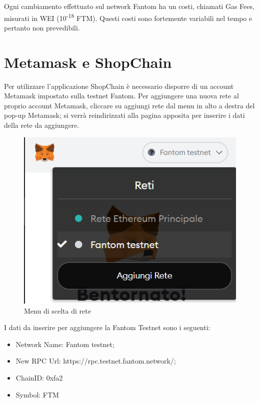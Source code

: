 
Ogni cambiamento effettuato sul network Fantom ha un costi, chiamati Gas Fees\glo{}, misurati in WEI\glo{} (10\textsuperscript{-18} FTM).
Questi costi sono fortemente variabili nel tempo e pertanto non prevedibili.

\section{Metamask e ShopChain}

Per utilizzare l'applicazione ShopChain è necessario disporre di un account Metamask impostato sulla testnet Fantom.
Per aggiungere una nuova rete al proprio account Metamask, cliccare su aggiungi rete dal menu in alto a destra del pop-up Metamask;
 si verrà reindirizzati alla pagina apposita per inserire i dati della rete da aggiungere.

 \begin{figure}[H]
    \centering
    \includegraphics[scale=0.6]{immagini/settmeta1.png}
    \caption{Menu di scelta di rete}
\end{figure} 

I dati da inserire per aggiungere la Fantom Testnet sono i seguenti:

\begin{itemize}
    \item Network Name: Fantom testnet;
    \item New RPC Url: https://rpc.testnet.fantom.network/;
    \item ChainID: 0xfa2
    \item Symbol: FTM
\end{itemize}

